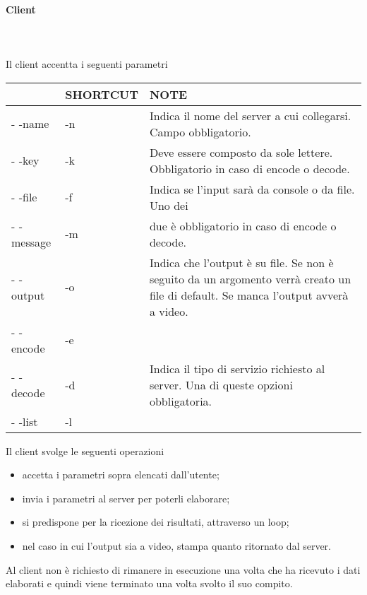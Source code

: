\documentclass[12pt]{article}
\begin{document}
\vspace*{2cm}
\paragraph{Client} \mbox{}\\ \\
Il client accentta i seguenti parametri \\

\begin{tabular}{| >{\centering\arraybackslash}m{2.5cm} | >{\centering\arraybackslash}m{2.5cm} | m{9cm}|}
    \hline
    {\bf OPZIONE} & {\bf SHORTCUT} & {\bf NOTE}\\ \hline
    - -name & -n & Indica il nome del server a cui collegarsi. Campo obbligatorio. \\ \hline
   		- -key & -k & Deve essere composto da sole lettere. Obbligatorio in caso di encode o decode.\\ \hline
   		- -file & -f & Indica se l'input sarà da console o da file. Uno dei\\
   		- -message & -m &  due è obbligatorio in caso di encode o decode.\\ \hline
   		- -output & -o & Indica che l'output è su file. Se non è seguito da un argomento verrà creato un file di default. Se manca l'output avverà a video.\\ \hline
   		- -encode & -e & \\
   		- -decode & -d & Indica il tipo di servizio richiesto al server. Una di queste opzioni obbligatoria.\\
   		- -list & -l & \\
    \hline
  \end{tabular}

 \phantom{1} \noindent Il client svolge le seguenti operazioni
\begin{itemize}
    \item accetta i parametri sopra elencati dall'utente;
    \item invia i parametri  al server per poterli elaborare;
    \item si predispone per la ricezione dei risultati, attraverso un loop;
    \item nel caso in cui l'output sia a video, stampa quanto ritornato dal server.
\end{itemize}
Al client non è richiesto di rimanere in esecuzione una volta che ha ricevuto i dati elaborati e quindi viene terminato una volta svolto il suo compito.
\end{document}
